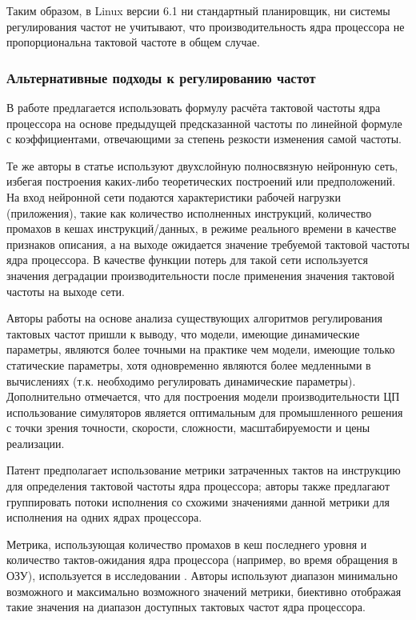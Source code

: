     Таким образом, в Linux версии 6.1 ни стандартный планировщик, ни системы регулирования частот
    не учитывают, что производительность ядра процессора не пропорциональна тактовой частоте
    в общем случае.

\subsubsection{Альтернативные подходы к регулированию частот}

    В работе \cite{liang2013performance} предлагается использовать формулу расчёта тактовой частоты
    ядра процессора на основе предыдущей предсказанной частоты по линейной формуле с коэффициентами,
    отвечающими за степень резкости изменения самой частоты.

    Те же авторы в статье
    \cite{chen2018learning} используют двухслойную полносвязную нейронную сеть, избегая построения
    каких-либо теоретических построений или предположений. На вход нейронной сети
    подаются характеристики рабочей нагрузки (приложения), такие как количество исполненных инструкций,
    количество промахов в кешах инструкций/данных, в режиме реального времени в качестве
    признаков описания, а на выходе ожидается значение требуемой тактовой частоты ядра процессора.
    В качестве функции потерь для такой сети используется значения деградации производительности после
    применения значения тактовой частоты на выходе сети.

    Авторы работы \cite{haririan2020dvfs} на основе анализа существующих алгоритмов регулирования
    тактовых частот пришли к выводу, что модели, имеющие динамические параметры, являются более точными
    на практике чем модели, имеющие только статические параметры, хотя одновременно являются более
    медленными в вычислениях (т.к. необходимо регулировать динамические параметры). Дополнительно
    отмечается, что для построения модели производительности ЦП использование симуляторов является
    оптимальным для промышленного решения с точки зрения точности, скорости, сложности,
    масштабируемости и цены реализации.

    Патент \cite{johnson2012frequency} предполагает использование метрики затраченных тактов на
    инструкцию для определения тактовой частоты ядра процессора; авторы также предлагают
    группировать потоки исполнения со схожими значениями данной метрики для исполнения на
    одних ядрах процессора.

    Метрика, использующая количество промахов в кеш последнего уровня и количество тактов-ожидания
    ядра процессора (например, во время обращения в ОЗУ), используется в исследовании \cite{hebbar2022pmu}.
    Авторы используют диапазон минимально возможного и максимально возможного значений метрики,
    биективно отображая такие значения на диапазон доступных тактовых частот ядра процессора.

